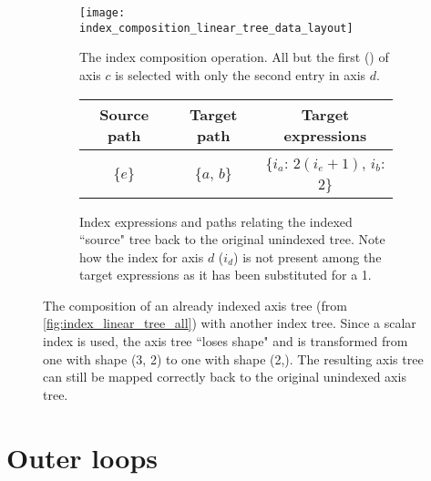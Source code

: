 \documentclass[thesis]{subfiles}
\begin{document}
\begin{figure}
  \centering
  \begin{subfigure}{\textwidth}
    \centering
    \texttt{[image: index\_composition\_linear\_tree\_data\_layout]}
    \caption{
      The index composition operation.
      All but the first () of axis $c$ is selected with only the second entry in axis $d$.
    }
    \label{fig:index_composition_linear_tree_data_layout}
  \end{subfigure}

  \vspace{1em}

  \begin{subfigure}{\textwidth}
    \centering
    \begin{tabular}{|c|c|c|}
      \hline
      \textbf{Source path} & \textbf{Target path} & \textbf{Target expressions} \\
      \hline
      \{$e$\} & \{$a$, $b$\} & \{$i_a$: $2 (i_e+1)$, $i_b$: $2$\} \\
      \hline
    \end{tabular}
    \caption{
      Index expressions and paths relating the indexed ``source" tree back to the original unindexed tree.
      Note how the index for axis $d$ ($i_d$) is not present among the target expressions as it has been substituted for a 1.
    }
    \label{fig:index_composition_linear_tree_exprs}
  \end{subfigure}

  \caption{
    The composition of an already indexed axis tree (from \cref{fig:index_linear_tree_all}) with another index tree.
    Since a scalar index is used, the axis tree ``loses shape" and is transformed from one with shape (3, 2) to one with shape (2,).
    The resulting axis tree can still be mapped correctly back to the original unindexed axis tree.
  }
  \label{fig:index_composition_linear_tree_all}
\end{figure}

\section{Outer loops}
\label{sec:outer_loops}
\end{document}
